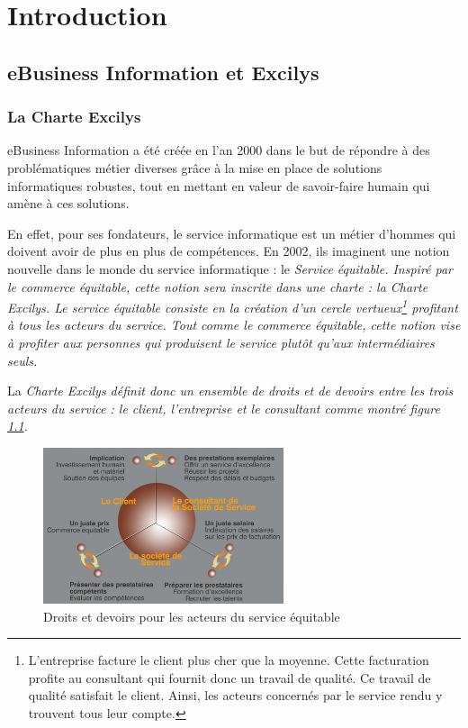 \chapter{Introduction}
\section{eBusiness Information et Excilys}

\subsection{La Charte Excilys}
eBusiness Information a été créée en l'an 2000 dans le but de répondre à des problématiques métier diverses grâce à la mise en place de solutions informatiques robustes, tout en mettant en valeur de savoir-faire humain qui amène à ces solutions.

En effet, pour ses fondateurs, le service informatique est un métier d'hommes qui doivent avoir de plus en plus de compétences. En 2002, ils imaginent une notion nouvelle dans le monde du service informatique : le \em{Service équitable}. Inspiré par le commerce équitable, cette notion sera inscrite dans une charte : la \em{Charte Excilys}. Le service équitable consiste en la création d'un cercle vertueux\footnote{L'entreprise facture le client plus cher que la moyenne. Cette facturation profite au consultant qui fournit donc un travail de qualité. Ce travail de qualité satisfait le client. Ainsi, les acteurs concernés par le service rendu y trouvent tous leur compte.} profitant à tous les acteurs du service. Tout comme le commerce équitable, cette notion vise à profiter aux personnes qui produisent le service plutôt qu'aux intermédiaires seuls.

La \em{Charte Excilys} définit donc un ensemble de droits et de devoirs entre les trois acteurs du service : le client, l'entreprise et le consultant comme montré figure \ref{droits_devoirs}.

\begin{figure}[h]
\begin{center}
\includegraphics[width=200pt]{img/droits_devoirs.jpg}
\end{center}
\caption{Droits et devoirs pour les acteurs du service équitable}
\label{droits_devoirs}
\end{figure}

